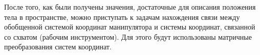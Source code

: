 \newpage
\hspace*{\parindent}После того, как были получены значения, достаточные для описания положения тела в пространстве, можно приступать к задачам нахождения связи между обобщенной системой координат манипулятора и системы координат, связанной со схватом (рабочим инструментом). Для этого будут использованы матричные преобразования систем координат.\\

